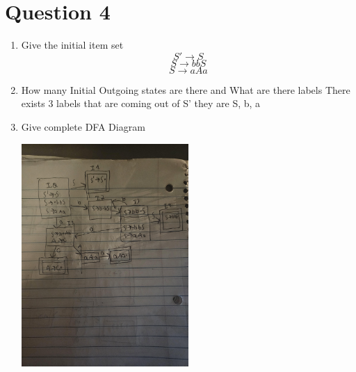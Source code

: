 \documentclass{article}
\begin{document}
    \section*{Question 4}
    \begin{enumerate}
	\item Give the initial item set
		\[S' \rightarrow S\]
		\[S \rightarrow bbS\]
		\[S \rightarrow aAa\]
	\item How many Initial Outgoing states are there and What are there labels
	There exists 3 labels that are coming out of S' they are S, b, a
	\item Give complete DFA Diagram
	\begin{center}
            \includegraphics[width=0.5\textwidth, angle=0]{figures/DFA3.jpg}
	\end{center}
    \end{enumerate}
    \newpage
\end{document}
